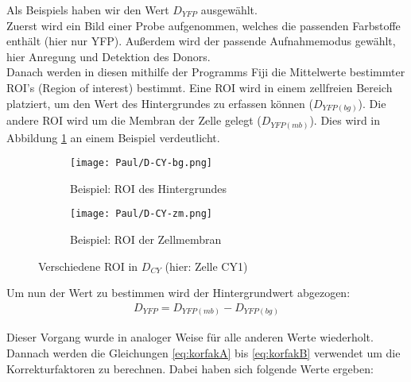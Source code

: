 Als Beispiels haben wir den Wert $D_{YFP}$ ausgewählt.\\
Zuerst wird ein Bild einer Probe aufgenommen, welches die passenden Farbstoffe enthält (hier nur YFP). Außerdem wird der passende Aufnahmemodus gewählt, hier Anregung und Detektion des Donors.\\
Danach werden in diesen mithilfe der Programms Fiji die Mittelwerte bestimmter ROI's (Region of interest) bestimmt. Eine ROI wird in einem zellfreien Bereich platziert, um den Wert des Hintergrundes zu erfassen können ($D_{YFP(bg)}$). Die andere ROI wird um die Membran der Zelle gelegt ($D_{YFP(mb)}$). Dies wird in Abbildung \ref{fig:VerschROI} an einem Beispiel verdeutlicht.

\begin{figure}[h]
    \centering
    \begin{subfigure}[]{0.45\textwidth}
        \centering
        \texttt{[image: Paul/D-CY-bg.png]}
        \caption{Beispiel: ROI des Hintergrundes}
    \end{subfigure}
    \hfill 
    \begin{subfigure}[]{0.45\textwidth}
        \centering
        \texttt{[image: Paul/D-CY-zm.png]}
        \caption{Beispiel: ROI der Zellmembran}
    \end{subfigure}
    \caption{Verschiedene ROI in $D_{CY}$ (hier: Zelle CY1)}
    \label{fig:VerschROI}
\end{figure}

Um nun der Wert zu bestimmen wird der Hintergrundwert abgezogen: 
\begin{align}
    D_{YFP} = D_{YFP(mb)} - D_{YFP(bg)}
\end{align}

\newpage
Dieser Vorgang wurde in analoger Weise für alle anderen Werte wiederholt. Dannach werden die Gleichungen \ref{eq:korfakA} bis \ref{eq:korfakB} verwendet um die Korrekturfaktoren zu berechnen. Dabei haben sich folgende Werte ergeben: \\

